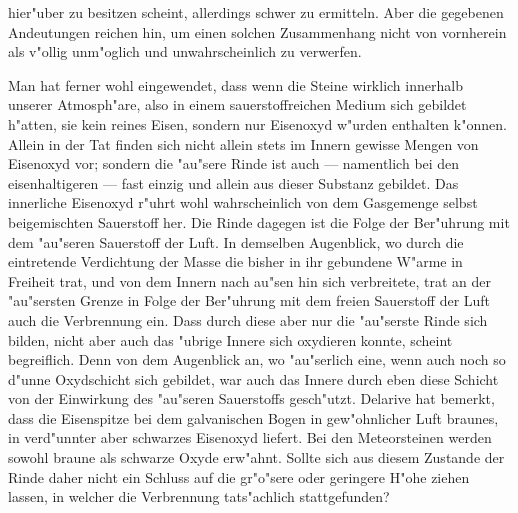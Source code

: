 \documentclass[a4paper, 8pt, oneside, polutonikogreek, german]{article}
\begin{document}
hier"uber zu besitzen scheint, allerdings schwer zu ermitteln. Aber die gegebenen Andeutungen reichen hin, um einen solchen Zusammenhang nicht von vornherein als v"ollig unm"oglich und unwahrscheinlich zu verwerfen.

Man hat ferner wohl eingewendet, dass wenn die Steine wirklich innerhalb unserer Atmosph"are, also in einem sauerstoffreichen Medium sich gebildet h"atten, sie kein reines Eisen, sondern nur Eisenoxyd w"urden enthalten k"onnen. Allein in der Tat finden sich nicht allein stets im Innern gewisse Mengen von Eisenoxyd vor; sondern die "au"sere Rinde ist auch --- namentlich bei den eisenhaltigeren --- fast einzig und allein aus dieser Substanz gebildet. Das innerliche Eisenoxyd r"uhrt wohl wahrscheinlich von dem Gasgemenge selbst beigemischten Sauerstoff her. Die Rinde dagegen ist die Folge der Ber"uhrung mit dem "au"seren Sauerstoff der Luft. In demselben Augenblick, wo durch die eintretende Verdichtung der Masse die bisher in ihr gebundene W"arme in Freiheit trat, und von dem Innern nach au"sen hin sich verbreitete, trat an der "au"sersten Grenze in Folge der Ber"uhrung mit dem freien Sauerstoff der Luft auch die Verbrennung ein. Dass durch diese aber nur die "au"serste Rinde sich bilden, nicht aber auch das "ubrige Innere sich oxydieren konnte, scheint begreiflich. Denn von dem Augenblick an, wo "au"serlich eine, wenn auch noch so d"unne Oxydschicht sich gebildet, war auch das Innere durch eben diese Schicht von der Einwirkung des "au"seren Sauerstoffs gesch"utzt. Delarive hat bemerkt, dass die Eisenspitze bei dem galvanischen Bogen in gew"ohnlicher Luft braunes, in verd"unnter aber schwarzes Eisenoxyd liefert. Bei den Meteorsteinen werden sowohl braune als schwarze Oxyde erw"ahnt. Sollte sich aus diesem Zustande der Rinde daher nicht ein Schluss auf die gr"o"sere oder geringere H"ohe ziehen lassen, in welcher die Verbrennung tats"achlich stattgefunden?
\end{document}
